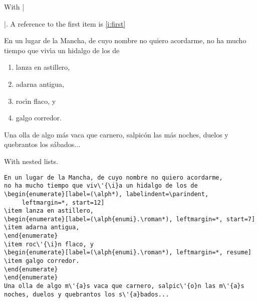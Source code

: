 \documentclass[a4paper]{ltxguide}
\newcommand\3{\unskip\enspace\fbox{\fontsize{4}{4}\selectfont NEW 3.0}}
\begin{document}
\begin{enumerate}[leftmargin=*]
\begin{enumerate}[leftmargin=\parindent]
\begin{enumerate}[labelindent=\parindent,|\allowbreak
| leftmargin=*,|\allowbreak| label=\Roman*.,|\allowbreak
| widest=IV,|\allowbreak| align=left]
\newsample

With |\begin{enumerate}[label=\fbox{\arabic*}]|. A reference to
the first item is \ref{i:first}

\samplesep

En un lugar de la Mancha, de cuyo nombre no quiero acordarme,
no ha mucho tiempo que viv\'{\i}a un hidalgo de los de
\begin{enumerate}[label=\fbox{\arabic*}]
\item \label{i:first}lanza en astillero,
\item adarna antigua,
\item roc\'{\i}n flaco, y
\item galgo corredor.
\end{enumerate}
Una olla de algo m\'{a}s vaca que carnero, salpic\'{o}n las m\'{a}s
noches, duelos y quebrantos los s\'{a}bados...

\newsample

With nested lists.

\samplesep

\begin{verbatim}
En un lugar de la Mancha, de cuyo nombre no quiero acordarme,
no ha mucho tiempo que viv\'{\i}a un hidalgo de los de
\begin{enumerate}[label=(\alph*), labelindent=\parindent,
     leftmargin=*, start=12]
\item lanza en astillero,
\begin{enumerate}[label=(\alph{enumi}.\roman*), leftmargin=*, start=7]
\item adarna antigua,
\end{enumerate}
\item roc\'{\i}n flaco, y
\begin{enumerate}[label=(\alph{enumi}.\roman*), leftmargin=*, resume]
\item galgo corredor.
\end{enumerate}
\end{enumerate}
Una olla de algo m\'{a}s vaca que carnero, salpic\'{o}n las m\'{a}s
noches, duelos y quebrantos los s\'{a}bados...
\end{verbatim}


\end{enumerate}
\end{enumerate}
\end{enumerate}
\end{enumerate}
\end{document}

